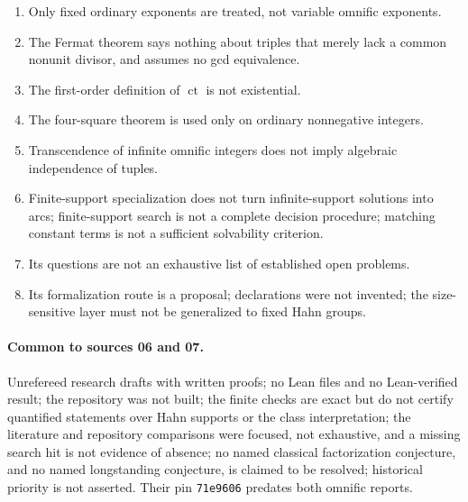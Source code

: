 \documentclass[11pt,oneside]{article}
\numberwithin{equation}{section}
\theoremstyle{definition}
\theoremstyle{remark}
\newcommand{\ct}{\operatorname{ct}}
\begin{document}
\begin{enumerate}[leftmargin=*,itemsep=1pt]
\item Only fixed ordinary exponents are treated, not variable omnific
exponents.
\item The Fermat theorem says nothing about triples that merely lack a common
nonunit divisor, and assumes no gcd equivalence.
\item The first-order definition of $\ct$ is not existential.
\item The four-square theorem is used only on ordinary nonnegative integers.
\item Transcendence of infinite omnific integers does not imply algebraic
independence of tuples.
\item Finite-support specialization does not turn infinite-support solutions
into arcs; finite-support search is not a complete decision procedure; matching
constant terms is not a sufficient solvability criterion.
\item Its questions are not an exhaustive list of established open problems.
\item Its formalization route is a proposal; declarations were not invented;
the size-sensitive layer must not be generalized to fixed Hahn groups.
\end{enumerate}

\paragraph{Common to sources 06 and 07.} Unrefereed research drafts with
written proofs; no Lean files and no Lean-verified result; the repository was
not built; the finite checks are exact but do not certify quantified
statements over Hahn supports or the class interpretation; the literature and
repository comparisons were focused, not exhaustive, and a missing search hit
is not evidence of absence; no named classical factorization conjecture, and
no named longstanding conjecture, is claimed to be resolved; historical
priority is not asserted. Their pin \texttt{71e9606} predates both omnific
reports.
\end{document}

